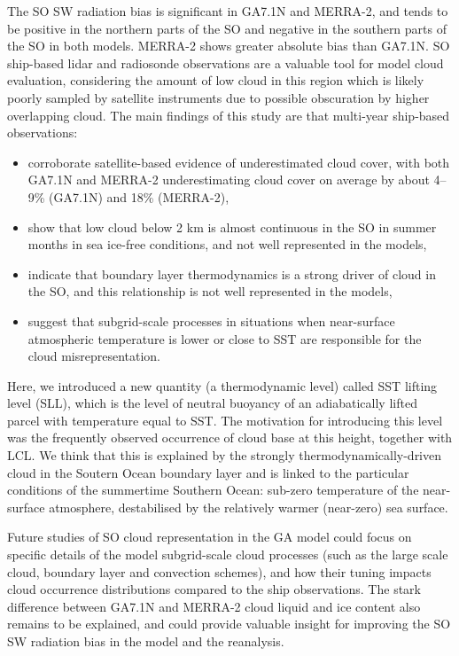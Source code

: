 The SO SW radiation bias is significant in GA7.1N and MERRA-2, and tends to be
positive in the northern parts of the SO and negative in the southern parts of
the SO in both models. MERRA-2 shows greater absolute bias than GA7.1N. SO
ship-based lidar and radiosonde observations are a valuable tool for model cloud
evaluation, considering the amount of low cloud in this region which is likely
poorly sampled by satellite instruments due to possible obscuration by higher
overlapping cloud. The main findings of this study are that multi-year
ship-based observations:

\begin{itemize}
\item corroborate satellite-based evidence of underestimated cloud cover, with
both GA7.1N and MERRA-2 underestimating cloud cover on average by about 4--9\%
(GA7.1N) and 18\% (MERRA-2),
\item show that low cloud below 2 \unit{km} is almost continuous in the SO in
summer months in sea ice-free conditions, and not well represented in the
models,
\item indicate that boundary layer thermodynamics is a strong driver of cloud in
the SO, and this relationship is not well represented in the models,
\item suggest that subgrid-scale processes in situations when near-surface
atmospheric temperature is lower or close to SST are responsible for the cloud
misrepresentation.
\end{itemize}

Here, we introduced a new quantity (a thermodynamic level) called SST lifting
level (SLL), which is the level of neutral buoyancy of an adiabatically lifted
parcel with temperature equal to SST. The motivation for introducing this level
was the frequently observed occurrence of cloud base at this height, together with
LCL. We think that this is explained by the strongly thermodynamically-driven
cloud in the Soutern Ocean boundary layer and is linked to the particular
conditions of the summertime Southern Ocean: sub-zero temperature of the
near-surface atmosphere, destabilised by the relatively warmer (near-zero)
sea surface.

Future studies of SO cloud representation in the GA model could focus on
specific details of the model subgrid-scale cloud processes (such as the large
scale cloud, boundary layer and convection schemes), and how their tuning
impacts cloud occurrence distributions compared to the ship observations. The
stark difference between GA7.1N and MERRA-2 cloud liquid and ice content also
remains to be explained, and could provide valuable insight for improving the
SO SW radiation bias in the model and the reanalysis.

